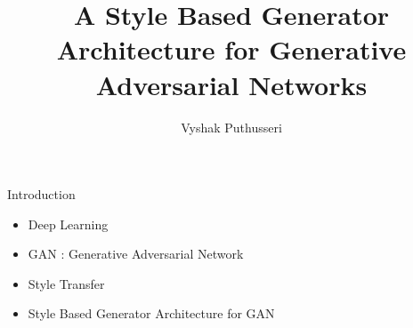 \documentclass[10pt]{beamer}
\title{A Style Based Generator Architecture for Generative Adversarial Networks}
\date{\regno}
\author{Vyshak Puthusseri}
\institute{MCA CET}
\begin{document}
\maketitle




{
\begin{frame}[fragile]{Introduction}

    \begin{itemize}
      \item Deep Learning 
      \item GAN : Generative Adversarial Network
      \item Style Transfer
      \item Style Based Generator Architecture for GAN
    \end{itemize}

\end{frame}
}
\end{document}
